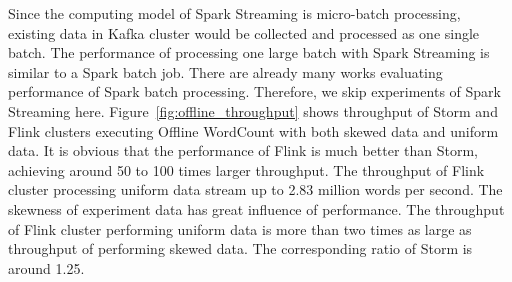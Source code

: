 Since the computing model of Spark Streaming is micro-batch processing, existing data in Kafka cluster would be collected and processed as one single batch. The performance of processing one large batch with Spark Streaming is similar to a Spark batch job. There are already many works evaluating performance of Spark batch processing. Therefore, we skip experiments of Spark Streaming here. Figure~\ref{fig:offline_throughput} shows throughput of Storm and Flink clusters executing Offline WordCount with both skewed data and uniform data. It is obvious that the performance of Flink is much better than Storm, achieving around 50 to 100 times larger throughput. The throughput of Flink cluster processing uniform data stream up to 2.83 million words per second.  The skewness of experiment data has great influence of performance. The throughput of Flink cluster performing uniform data is more than two times as large as throughput of performing skewed data. The corresponding ratio of Storm is around 1.25. 

